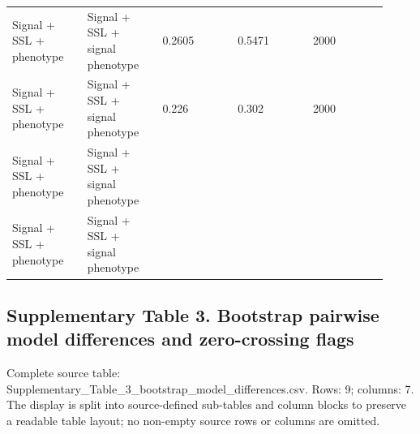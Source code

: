 \documentclass[utf8]{frontiers_suppmat}
\begin{document}
\begin{landscape}
\begin{longtable}{L{0.184\linewidth} L{0.184\linewidth} L{0.184\linewidth} L{0.184\linewidth} L{0.184\linewidth}}
Signal + SSL + phenotype & Signal + SSL + signal phenotype & 0.\allowbreak{}2605 & 0.\allowbreak{}5471 & 2000 \\
Signal + SSL + phenotype & Signal + SSL + signal phenotype & 0.\allowbreak{}226 & 0.\allowbreak{}302 & 2000 \\
Signal + SSL + phenotype & Signal + SSL + signal phenotype &  &  &  \\
Signal + SSL + phenotype & Signal + SSL + signal phenotype &  &  &  \\
\end{longtable}
\normalsize
\end{landscape}


\clearpage

\subsection*{Supplementary Table 3. Bootstrap pairwise model differences and zero-crossing flags}

Complete source table: Supplementary\_\allowbreak{}Table\_\allowbreak{}3\_\allowbreak{}bootstrap\_\allowbreak{}model\_\allowbreak{}differences.\allowbreak{}csv. Rows: 9; columns: 7. The display is split into source-defined sub-tables and column blocks to preserve a readable table layout; no non-empty source rows or columns are omitted.
\end{document}
